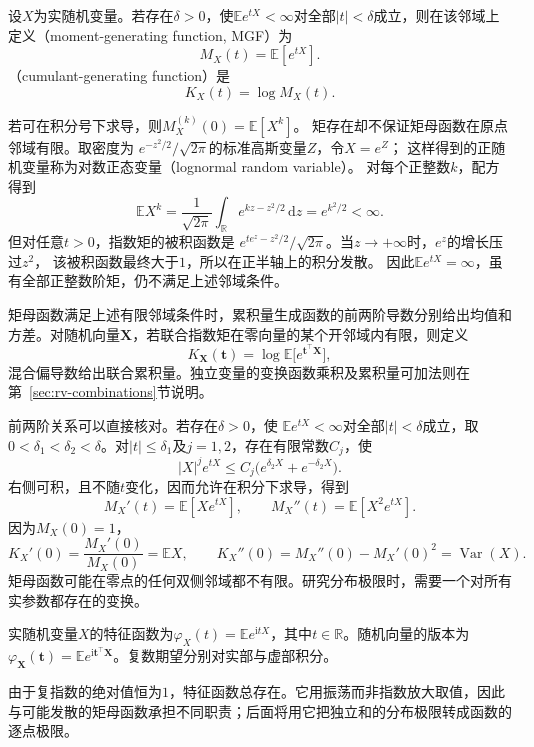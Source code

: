 \begin{definition}[矩母函数与累积量生成函数]
  \label{def:probability-moment-generating-functions}
设\(X\)为实随机变量。若存在\(\delta>0\)，使\(\mathbb E e^{tX}<\infty\)对全部\(|t|<\delta\)成立，则在该邻域上定义（moment-generating function, MGF）为
\[ M_X(t)=\mathbb{E}[e^{tX}]. \]
（cumulant-generating function）是
\[ K_X(t)=\log M_X(t). \]
\end{definition}
若可在积分号下求导，则\(M_X^{(k)}(0)=\mathbb{E}[X^k]\)。
矩存在却不保证矩母函数在原点邻域有限。取密度为
\(e^{-z^2/2}/\sqrt{2\pi}\)的标准高斯变量\(Z\)，令\(X=e^Z\)；
这样得到的正随机变量称为对数正态变量（lognormal random variable）。
对每个正整数\(k\)，配方得到
\[
 \mathbb E X^k
 =\frac1{\sqrt{2\pi}}\int_{\mathbb R}e^{kz-z^2/2}\,\mathrm dz
 =e^{k^2/2}<\infty.
\]
但对任意\(t>0\)，指数矩的被积函数是
\(e^{te^z-z^2/2}/\sqrt{2\pi}\)。当\(z\to+\infty\)时，\(e^z\)的增长压过\(z^2\)，
该被积函数最终大于\(1\)，所以在正半轴上的积分发散。
因此\(\mathbb E e^{tX}=\infty\)，虽有全部正整数阶矩，仍不满足上述邻域条件。

矩母函数满足上述有限邻域条件时，累积量生成函数的前两阶导数分别给出均值和方差。对随机向量\(\bm{X}\)，若联合指数矩在零向量的某个开邻域内有限，则定义
\[ K_{\bm{X}}(\bm{t})
  =\log\mathbb{E}\bigl[e^{\bm{t}^{\top}\bm{X}}\bigr], \]
混合偏导数给出联合累积量。独立变量的变换函数乘积及累积量可加法则在第~\ref{sec:rv-combinations}节说明。

前两阶关系可以直接核对。若存在\(\delta>0\)，使
\(\mathbb E e^{tX}<\infty\)对全部\(|t|<\delta\)成立，取\(0<\delta_1<\delta_2<\delta\)。对\(|t|\leq\delta_1\)及\(j=1,2\)，存在有限常数\(C_j\)，使
\[ |X|^j e^{tX}\leq C_j\bigl(e^{\delta_2X}+e^{-\delta_2X}\bigr). \]
右侧可积，且不随\(t\)变化，因而允许在积分下求导，得到
\[
  M_X'(t)=\mathbb{E}[Xe^{tX}],\qquad
  M_X''(t)=\mathbb{E}[X^2e^{tX}].
\]
因为\(M_X(0)=1\)，
\[
  K_X'(0)=\frac{M_X'(0)}{M_X(0)}=\mathbb{E}X,
  \qquad
  K_X''(0)
  =M_X''(0)-M_X'(0)^2
  =\operatorname{Var}(X).
\]
矩母函数可能在零点的任何双侧邻域都不有限。研究分布极限时，需要一个对所有实参数都存在的变换。
\begin{definition}[特征函数]
  \label{def:probability-characteristic-function}
实随机变量\(X\)的特征函数为\(\varphi_X(t)=\mathbb E e^{\mathrm i tX}\)，其中\(t\in\mathbb R\)。随机向量的版本为\(\varphi_{\bm X}(\bm t)=\mathbb E e^{\mathrm i\bm t^\top\bm X}\)。复数期望分别对实部与虚部积分。
\end{definition}
由于复指数的绝对值恒为\(1\)，特征函数总存在。它用振荡而非指数放大取值，因此与可能发散的矩母函数承担不同职责；后面将用它把独立和的分布极限转成函数的逐点极限。

